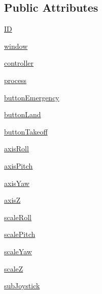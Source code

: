 \subsection*{Public Attributes}
\begin{DoxyCompactItemize}
\item 
\hyperlink{classgamepadcontroller_1_1gamepadController_a3f5663a47a7792c7efeee56d86eaf641}{I\-D}
\item 
\hyperlink{classgamepadcontroller_1_1gamepadController_ab004a378de876574e55c879d5ea862ec}{window}
\item 
\hyperlink{classgamepadcontroller_1_1gamepadController_a10b7595ea5c2655a9ed3ddba6f62424d}{controller}
\item 
\hyperlink{classgamepadcontroller_1_1gamepadController_aec42e233c0618abef806d0b548dec8d4}{process}
\item 
\hyperlink{classgamepadcontroller_1_1gamepadController_a59a38e68ed8c9b0e1c5e2a84987dd1db}{button\-Emergency}
\item 
\hyperlink{classgamepadcontroller_1_1gamepadController_a56184378a52735c52b4a3040e3e72f09}{button\-Land}
\item 
\hyperlink{classgamepadcontroller_1_1gamepadController_a9b7c53bfe95d03188a100b3119a1d431}{button\-Takeoff}
\item 
\hyperlink{classgamepadcontroller_1_1gamepadController_a156019a4d829536a5ebf430e8eae6204}{axis\-Roll}
\item 
\hyperlink{classgamepadcontroller_1_1gamepadController_a800de9de7b4d166b545c5dbbd411b423}{axis\-Pitch}
\item 
\hyperlink{classgamepadcontroller_1_1gamepadController_a1bf5e24ecbf94d3a4ea99dd267b548bc}{axis\-Yaw}
\item 
\hyperlink{classgamepadcontroller_1_1gamepadController_af158dff2b0b9efc973c94c50c60ac938}{axis\-Z}
\item 
\hyperlink{classgamepadcontroller_1_1gamepadController_aba4b8e93dc52cb30c7069a366ab03bcc}{scale\-Roll}
\item 
\hyperlink{classgamepadcontroller_1_1gamepadController_a02885140d6d2efc1f469e063018a8c46}{scale\-Pitch}
\item 
\hyperlink{classgamepadcontroller_1_1gamepadController_ad9e4b5c372ecf121fd1a45baba34cfb8}{scale\-Yaw}
\item 
\hyperlink{classgamepadcontroller_1_1gamepadController_a80be0bf69c042473e69428bb39988494}{scale\-Z}
\item 
\hyperlink{classgamepadcontroller_1_1gamepadController_aa6797c1d03e7d3c9aa483ae386b25c52}{sub\-Joystick}
\end{DoxyCompactItemize}
